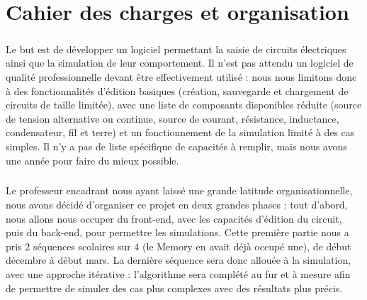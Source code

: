 \chapter{Cahier des charges et organisation}

\paragraph{}Le but est de développer un logiciel permettant la saisie de circuits électriques ainsi que la simulation de leur comportement. Il n'est pas attendu un logiciel de qualité professionnelle devant être effectivement utilisé : nous nous limitons donc à des fonctionnalités d'édition basiques (création, sauvegarde et chargement de circuits de taille limitée), avec une liste de composants disponibles réduite (source de tension alternative ou continue, source de courant, résistance, inductance, condensateur, fil et terre) et un fonctionnement de la simulation limité à des cas simples. Il n'y a pas de liste spécifique de capacités à remplir, mais nous avons une année pour faire du mieux possible.

\paragraph{}Le professeur encadrant nous ayant laissé une grande latitude organisationnelle, nous avons décidé d'organiser ce projet en deux grandes phases : tout d'abord, nous allons nous occuper du front-end, avec les capacités d'édition du circuit, puis du back-end, pour permettre les simulations. Cette première partie nous a pris 2 séquences scolaires sur 4 (le Memory en avait déjà occupé une), de début décembre à début mars. La dernière séquence sera donc allouée à la simulation, avec une approche itérative : l'algorithme sera complété au fur et à mesure afin de permettre de simuler des cas plus complexes avec des résultats plus précis.